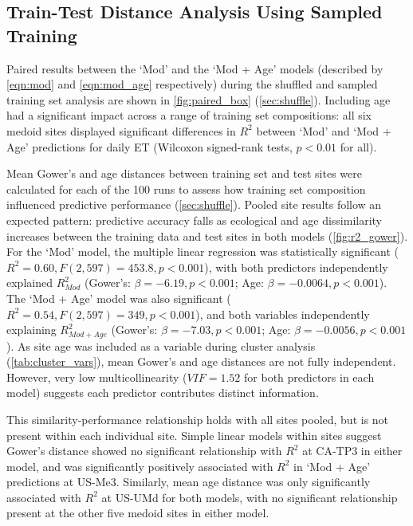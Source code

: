 \subsection{Train-Test Distance Analysis Using Sampled Training} \label{sec:sampled}
Paired results between the `Mod' and the `Mod + Age' models (described by \autoref{eqn:mod} and \autoref{eqn:mod_age} respectively) during the shuffled and sampled training set analysis are shown in \autoref{fig:paired_box} (\ref{sec:shuffle}). Including age had a significant impact across a range of training set compositions: all six medoid sites displayed significant differences in $R^2$ between `Mod' and `Mod + Age' predictions for daily \ac{ET} (Wilcoxon signed-rank tests, $p < 0.01$ for all).
\par Mean Gower's and age distances between training set and test sites were calculated for each of the 100 runs to assess how training set composition influenced predictive performance (\ref{sec:shuffle}). Pooled site results follow an expected pattern: predictive accuracy falls as ecological and age dissimilarity increases between the training data and test sites in both models (\autoref{fig:r2_gower}). For the `Mod' model, the multiple linear regression was statistically significant ($R^2 = 0.60, F(2, 597) = 453.8, p < 0.001$), with both predictors independently explained $R^2_{Mod}$ (Gower's: $\beta = -6.19, p < 0.001$; Age: $\beta = -0.0064, p < 0.001$). The `Mod + Age' model was also significant ($R^2 = 0.54, F(2, 597) = 349, p < 0.001$), and both variables independently explaining $R^2_{Mod + Age}$ (Gower's: $\beta = -7.03, p < 0.001$; Age: $\beta = -0.0056, p < 0.001$). As site age was included as a variable during cluster analysis (\autoref{tab:cluster_vars}), mean Gower's and age distances are not fully independent. However, very low multicollinearity ($VIF = 1.52$ for both predictors in each model) suggests each predictor contributes distinct information.  
\par This similarity-performance relationship holds with all sites pooled, but is not present within each individual site. Simple linear models within sites suggest Gower's distance showed no significant relationship with $R^2$ at CA-TP3 in either model, and was significantly positively associated with $R^2$ in `Mod + Age' predictions at US-Me3. Similarly, mean age distance was only significantly associated with $R^2$ at US-UMd for both models, with no significant relationship present at the other five medoid sites in either model. 



